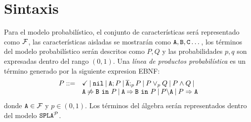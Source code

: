 
\section{Sintaxis}

Para el modelo probabilístico, el conjunto de características será representado como $\calF$,
las características aisladas se mostrarán como $\feature{A}, \feature{B}, \feature{C}\dots$,
los términos del modelo probabilístico serán descritos como $P,Q$ y
las probabilidades $p,q$ son expresadas dentro del rango $(0,1)$.
\bdfn
Una \emph{línea de productos probabilística} es un término generado por la siguiente
expresion EBNF:
$$
\begin{array}{ll}
  P::=& \checkmark \barra \nil \barra \feature{A};P \barra
    \ofeature{A};_{p} P \barra P \choice_{p} Q \barra P \paral Q \barra
  \\ 
  & \exclude{A}{B}{P}\barra  \require{A}{B}{P}\barra  \forbid{A}{P}\barra  \mandatory{A}{P}\\ 
\end{array}     
$$
\noindent 
donde $\feature{A} \in \calF$ y $p\in(0,1)$. Los términos del álgebra
serán representados dentro del modelo $\fodaPAp$.
\edfn


